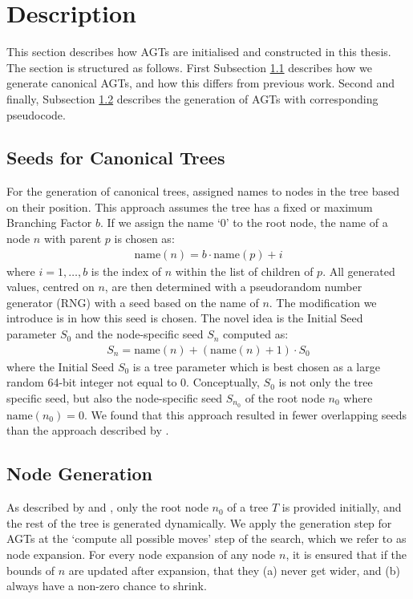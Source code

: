 \section{Description}
\label{sec:AGTmodel}
This section describes how AGTs are initialised and constructed in this thesis. The section is structured as follows. First Subsection \ref{subsec:AGTseeds} describes how we generate canonical AGTs, and how this differs from previous work. Second and finally, Subsection \ref{subsec:AGTgeneration} describes the generation of AGTs with corresponding pseudocode.

\subsection{Seeds for Canonical Trees}
\label{subsec:AGTseeds}
For the generation of canonical trees,  assigned names to nodes in the tree based on their position. This approach assumes the tree has a fixed or maximum Branching Factor $b$. If we assign the name `0' to the root node, the name of a node $n$ with parent $p$ is chosen as:
\begin{gather}
    \text{name}\left(n\right) = b\cdot \text{name}\left(p\right) + i
    \label{eq:AGT:nodeName}
\end{gather}
where $i=1,\dots,b$ is the index of $n$ within the list of children of $p$. All generated values, centred on $n$, are then determined with a pseudorandom number generator (RNG) with a seed based on the name of $n$. The modification we introduce is in how this seed is chosen. The novel idea is the Initial Seed parameter $S_0$ and the node-specific seed $S_n$ computed as:
\begin{gather}
    S_n = \text{name}\left(n\right) + \left(\text{name}\left(n\right) + 1\right) \cdot S_0
\end{gather}
where the Initial Seed $S_0$ is a tree parameter which is best chosen as a large random 64-bit integer not equal to 0. Conceptually, $S_0$ is not only the tree specific seed, but also the node-specific seed $S_{n_0}$ of the root node $n_0$ where $\text{name}\left(n_0\right)=0$. We found that this approach resulted in fewer overlapping seeds than the approach described by \cite{Berliner1979}.

\subsection{Node Generation}
\label{subsec:AGTgeneration}
As described by  and , only the root node $n_0$ of a tree $T$ is provided initially, and the rest of the tree is generated dynamically. We apply the generation step for AGTs at the `compute all possible moves' step of the search, which we refer to as node expansion. For every node expansion of any node $n$, it is ensured that if the bounds of $n$ are updated after expansion, that they (a) never get wider, and (b) always have a non-zero chance to shrink.

